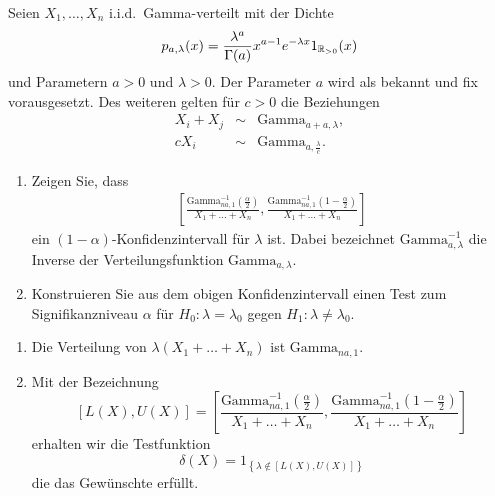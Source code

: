 Seien $X_1, \ldots, X_n$ i.i.d.\ Gamma-verteilt mit der Dichte
\begin{equation*}
    p_{a,\lambda} (x) = \frac{\lambda^a}{ \Gamma(a)} x^{a-1} e^{-\lambda x} 1_{ \mathbb R_{>0}  } (x)
\end{equation*} 
und Parametern $a>0$ und $\lambda>0$. Der Parameter $a$ wird als bekannt und fix vorausgesetzt. 
Des weiteren gelten für $c>0$ die Beziehungen
\begin{eqnarray*}
    X_i + X_j &\sim& \textrm{Gamma}_{a+a, \lambda}, \\
    c X_i & \sim & \textrm{Gamma}_{a, \frac{\lambda}{c}}.
\end{eqnarray*}
\begin{enumerate}
    \item Zeigen Sie, dass \begin{eqnarray*}
            \left[  \frac{ \textrm{Gamma}^{-1}_{na, 1} ( \frac{\alpha}{2})  }{X_1 + \ldots + X_n}, 
            \frac{ \textrm{Gamma}^{-1}_{na, 1} ( 1- \frac{\alpha}{2})  }{X_1+ \ldots + X_n}  \right]
        \end{eqnarray*} ein $(1-\alpha)$-Konfidenzintervall für $\lambda$ ist.
        Dabei bezeichnet $\textrm{Gamma}^{-1}_{a,\lambda}$ die Inverse der Verteilungsfunktion 
        $\textrm{Gamma}_{a,\lambda}$.
    \item Konstruieren Sie aus dem obigen Konfidenzintervall einen Test zum Signifikanzniveau
        $\alpha$ für $H_0: \lambda=\lambda_0$ gegen $H_1: \lambda\neq \lambda_0$.
\end{enumerate} 

\solution
\begin{enumerate}
    \item Die Verteilung von $\lambda (X_1 + \ldots + X_n)$ ist $\textrm{Gamma}_{na, 1}$.
    \item Mit der Bezeichnung 
        \begin{equation*}
            \left[ L(X), U(X) \right] = 
            \left[  \frac{ \textrm{Gamma}^{-1}_{na, 1} ( \frac{\alpha}{2})  }{X_1 + \ldots + X_n}, 
            \frac{ \textrm{Gamma}^{-1}_{na, 1} ( 1- \frac{\alpha}{2})  }{X_1+ \ldots + X_n}  \right]
        \end{equation*}
        erhalten wir die Testfunktion
        \begin{equation*}
            \delta(X) = 1_{ \left\{ \lambda \nin \left[ L(X), U(X) \right] \right\}   }
        \end{equation*} die das Gewünschte erfüllt. 
\end{enumerate}













